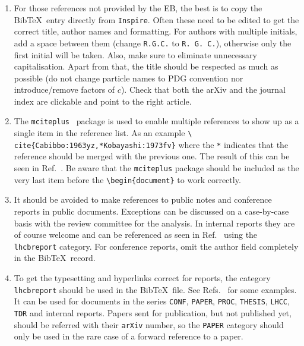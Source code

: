 \begin{enumerate}
\item For those references not provided by the EB, the best
  is to copy the Bib\TeX\ entry directly from
  \texttt{Inspire}. Often these need to be edited to get the 
  correct title, author names and formatting. 
  For authors with multiple initials, add a space between them (change \texttt{R.G.C.} to \texttt{R. G. C.}),
  otherwise only the first initial will be taken. 
  Also, make sure to eliminate unnecessary capitalisation.
  Apart from that, the title should be respected as much as possible
  (\eg do not change particle names to PDG convention nor introduce/remove factors of $c$).
  Check that both the arXiv and the journal index are clickable
  and point to the right article.


\item The \texttt{mciteplus}~\cite{mciteplus} package is used
  to enable multiple references to show up as a single item in the
  reference list. As an example \texttt{\textbackslash
    cite\{Cabibbo:1963yz,*Kobayashi:1973fv\}} where the \texttt{*}
  indicates that the reference should be merged with the previous
  one. The result of this can be seen in
  Ref.~\cite{Cabibbo:1963yz,*Kobayashi:1973fv}. Be aware that the
  \texttt{mciteplus} package should be included as the very last item
  before the \texttt{\textbackslash begin\{document\}} to work
  correctly.

\item It should be avoided to make references to public notes and
  conference reports in public documents. Exceptions can be discussed
  on a case-by-case basis with the review committee for the
  analysis. In internal reports they are of course welcome and can be
  referenced as seen in Ref.~\cite{LHCb-CONF-2011-003} using the
  \texttt{lhcbreport} category. For conference reports, omit the
  author field completely in the Bib\TeX\ record.

\item To get the typesetting and hyperlinks correct for \lhcb reports,
  the category \texttt{lhcbreport} should be used in the Bib\TeX\
  file. See Refs.~\cite{LHCb-INT-2011-047, *LHCb-ANA-2011-078,
    *CERN-THESIS-2014-057, *LHCb-PROC-2014-017, *LHCB-TALK-2014-257}
  for some examples. It can be used for \lhcb documents in the series
  \texttt{CONF}, \texttt{PAPER}, \texttt{PROC}, \texttt{THESIS},
  \texttt{LHCC}, \texttt{TDR} and internal \lhcb reports. Papers sent
  for publication, but not published yet, should be referred with
  their \texttt{arXiv} number, so the \texttt{PAPER} category should
  only be used in the rare case of a forward reference to a paper.


\end{enumerate}
